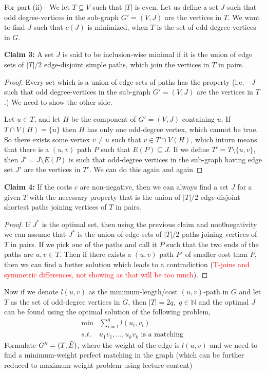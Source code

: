 \documentclass{article}
\numberwithin{equation}{section}
\newcommand{\card}[1]{\left|#1\right|}
\begin{document}
For part (ii) - We let $T\subseteq V$ such that $\card{T}$ is even. Let us define a set $J$ such that odd degree-vertices in the sub-graph $G' = (V, J)$ are the vertices in $T$. We want to find $J$ such that $c(J)$ is minimized, when $T$ is the set of odd-degree vertices in $G$. 

\noindent \textbf{Claim 3:} A set $J$ is said to be inclusion-wise minimal if it is the union of edge sets of $\card{T}/2$ edge-disjoint simple paths, which join the vertices in $T$ in pairs. 
\begin{proof}
    Every set which is a union of edge-sets of paths has the property (i.e. - $J$ such that odd degree-vertices in the sub-graph $G' = (V, J)$ are the vertices in $T$.) We need to show the other side. 

    Let $u \in T$, and let $H$ be the component of $G'=(V, J)$ containing $u$. If $T\cap V(H) = \{u\}$ then $H$ has only one odd-degree vertex, which cannot be true. So there exists some vertex $v\not = u$ such that $v \in T \cap V(H)$, which inturn means that there is a $(u, v)$ path $P$ such that $E(P) \subseteq J$. If we define $T' = T\setminus \{u, v\}$, then $J' = J\setminus E(P)$ is such that odd-degree vertices in the sub-graph having edge set $J'$ are the vertices in $T'$. We can do this again and again
\end{proof}

\noindent \textbf{Claim 4:} If the costs $c$ are non-negative, then we can always find a set $J$ for a given $T$ with the necessary property that is the union of $\card{T}/2$ edge-disjoint shortest paths joining vertices of $T$ in pairs. 
\begin{proof}
    If $J^*$ is the optimal set, then using the previous claim and non0negativity we can assume that $J^*$ is the union of edge-sets of $\card{T}/2$ paths joining vertices of $T$ in pairs. If we pick one of the paths and call it $P$ such that the two ends of the paths are $u, v\in T$. Then if there exists a $(u, v)$ path $P'$ of smaller cost than $P$, then we can find a better solution which leads to a contradiction (\textcolor{red}{T-joins and symmetric differences, not showing as that will be too much}). 
\end{proof}
Now if we denote $l(u, v)$ as the minimum-length/cost $(u, v)$-path in $G$ and let $T$ as the set of odd-degree vertices in $G$, then $\card{T} = 2q, \, \, q\in \mathbb{N}$ and the optimal $J$ can be found using the optimal solution of the following problem, 
\begin{equation}
    \begin{array}{cc}
        \min  & \sum_{i=1}^{q} l(u_i, v_i) \\
         s.t. & u_1v_1,\dots, u_kv_k \text{ is a matching }
    \end{array}
\end{equation}
Formulate $G'' = (T, \Tilde{E})$, where the weight of the edge is $l(u, v)$ and we need to find a minimum-weight perfect matching in the graph (which can be further reduced to maximum weight problem using lecture content) 
\end{document}
